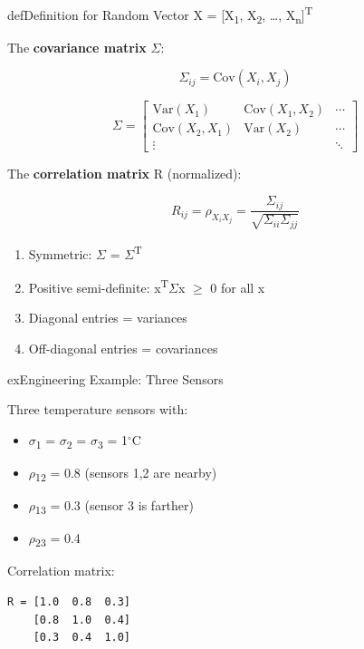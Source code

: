 
\begin{PSbox}[unbreakable]{def}{Definition for Random Vector X = [X\textsubscript{1}, X\textsubscript{2}, …, X\textsubscript{n}]\textsuperscript{T}}

The \textbf{covariance matrix} \ensuremath{\Sigma}:

\[\Sigma_{ij} = \text{Cov}(X_i, X_j)\]

\[\Sigma = \begin{bmatrix} \text{Var}(X_1) & \text{Cov}(X_1,X_2) & \cdots \\ \text{Cov}(X_2,X_1) & \text{Var}(X_2) & \cdots \\ \vdots & & \ddots \end{bmatrix}\]

The \textbf{correlation matrix} R (normalized):

\[R_{ij} = \rho_{X_i X_j} = \frac{\Sigma_{ij}}{\sqrt{\Sigma_{ii}\Sigma_{jj}}}\]

\end{PSbox}


\begin{enumerate}
\def\labelenumi{\arabic{enumi}.}
\tightlist
\item
  Symmetric: \ensuremath{\Sigma} = \ensuremath{\Sigma}\textsuperscript{T}
\item
  Positive semi-definite: x\textsuperscript{T}\ensuremath{\Sigma}x \ensuremath{\ge} 0 for all x
\item
  Diagonal entries = variances
\item
  Off-diagonal entries = covariances
\end{enumerate}

\begin{PSbox}[unbreakable]{ex}{Engineering Example: Three Sensors}

Three temperature sensors with:

\begin{itemize}
\tightlist
\item
  \ensuremath{\sigma}\textsubscript{1} = \ensuremath{\sigma}\textsubscript{2} = \ensuremath{\sigma}\textsubscript{3} = 1\ensuremath{^{\circ}}C
\item
  \ensuremath{\rho}\textsubscript{12} = 0.8 (sensors 1,2 are nearby)
\item
  \ensuremath{\rho}\textsubscript{13} = 0.3 (sensor 3 is farther)
\item
  \ensuremath{\rho}\textsubscript{23} = 0.4
\end{itemize}

Correlation matrix:


\begin{PSplaincode}
\begin{Verbatim}
R = [1.0  0.8  0.3]
    [0.8  1.0  0.4]
    [0.3  0.4  1.0]
\end{Verbatim}
\end{PSplaincode}

\end{PSbox}

